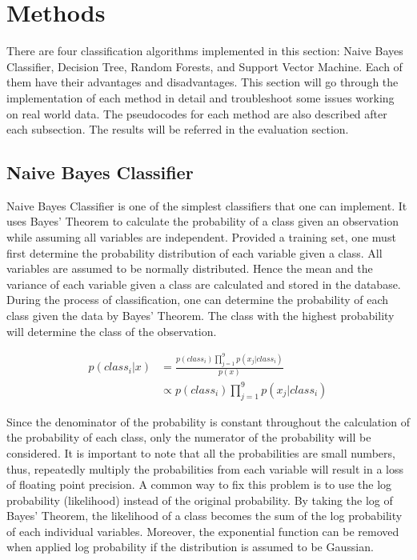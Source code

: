 \documentclass[twoside]{article}
\begin{document}

\section{Methods}
There are four classification algorithms implemented in this section: Naive Bayes Classifier, Decision Tree, Random Forests, and Support Vector Machine. Each of them have their advantages and disadvantages. This section will go through the implementation of each method in detail and troubleshoot some issues working on real world data. The pseudocodes for each method are also described after each subsection. The results will be referred in the evaluation section.

\subsection{Naive Bayes Classifier}
Naive Bayes Classifier is one of the simplest classifiers that one can implement. It uses Bayes' Theorem to calculate the probability of a class given an observation while assuming all variables are independent. Provided a training set, one must first determine the probability distribution of each variable given a class. All variables are assumed to be normally distributed. Hence the mean and the variance of each variable given a class are calculated and stored in the database. During the process of classification, one can determine the probability of each class given the data by Bayes' Theorem. The class with the highest probability will determine the class of the observation.

\begin{align*}
p(class_i | x) &= \frac{p(class_i) \prod\limits_{j=1}^{9}  p(x_j|class_i)}{p(x)}\\
&\propto p(class_i) \prod\limits_{j=1}^{9}  p(x_j|class_i)
\end{align*}

Since the denominator of the probability is constant throughout the calculation of the probability of each class, only the numerator of the probability will be considered. It is important to note that all the probabilities are small numbers, thus, repeatedly multiply the probabilities from each variable will result in a loss of floating point precision. A common way to fix this problem is to use the log probability (likelihood) instead of the original probability. By taking the log of Bayes' Theorem, the likelihood of a class becomes the sum of the log probability of each individual variables. Moreover, the exponential function can be removed when applied log probability if the distribution is assumed to be Gaussian.
\end{document}
